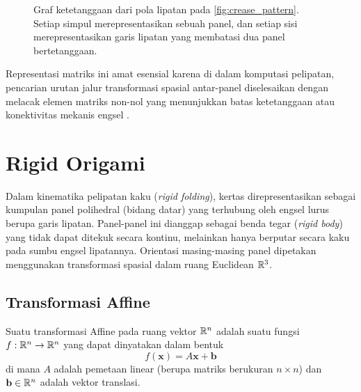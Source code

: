 \begin{figure}[H]
  \centering
  \caption{Graf ketetanggaan dari pola lipatan pada \ref{fig:crease_pattern}. Setiap simpul merepresentasikan sebuah panel, dan setiap sisi merepresentasikan garis lipatan yang membatasi dua panel bertetanggaan.}
  \label{fig:adjacency_graph}
\end{figure}

Representasi matriks ini amat esensial karena di dalam komputasi pelipatan, pencarian urutan jalur transformasi spasial antar-panel diselesaikan dengan melacak elemen matriks non-nol yang menunjukkan batas ketetanggaan atau konektivitas mekanis engsel \parencite{ku2014realization}.

\section{Rigid Origami}
Dalam kinematika pelipatan kaku (\textit{rigid folding}), kertas direpresentasikan sebagai kumpulan panel polihedral (bidang datar) yang terhubung oleh engsel lurus berupa garis lipatan. Panel-panel ini dianggap sebagai benda tegar (\textit{rigid body}) yang tidak dapat ditekuk secara kontinu, melainkan hanya berputar secara kaku pada sumbu engsel lipatannya. Orientasi masing-masing panel dipetakan menggunakan transformasi spasial dalam ruang Euclidean $\mathbb{R}^3$.

\subsection{Transformasi Affine}
\begin{definisi}
  Suatu transformasi Affine pada ruang vektor $\mathbb{R}^n$ adalah suatu fungsi $f: \mathbb{R}^n \to \mathbb{R}^n$ yang dapat dinyatakan dalam bentuk
  \[
    f(\mathbf{x}) = A\mathbf{x} + \mathbf{b}
  \]
  di mana $A$ adalah pemetaan linear (berupa matriks berukuran $n \times n$) dan $\mathbf{b} \in \mathbb{R}^n$ adalah vektor translasi.
\end{definisi}

